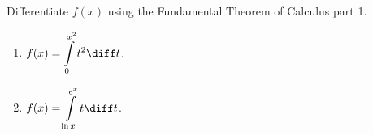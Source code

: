 Differentiate $f(x)$ using the Fundamental Theorem of Calculus part 1.
\begin{enumerate}[ref={\fcProblemRef}]
\item  $\displaystyle f(x)=\int\limits_{0}^{x^2} t^2\diff t $.

\item \label{problemd/dx(int_(ln x)^(e^x)tdt)} $\displaystyle f(x)=\int\limits_{\ln x}^{e^x} t\diff t $.



\end{enumerate}